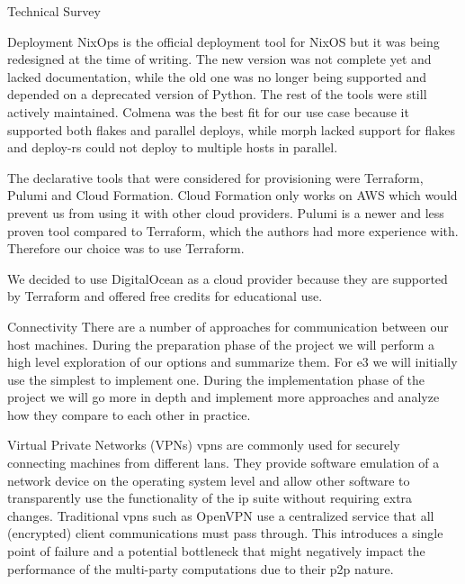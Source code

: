 \begin{frame}{Technical Survey}
\begin{block}{Deployment}
NixOps is the official deployment tool for NixOS but it was being
redesigned at the time of writing. The new version was not complete yet
and lacked documentation, while the old one was no longer being
supported and depended on a deprecated version of Python. The rest of
the tools were still actively maintained. Colmena was the best fit for
our use case because it supported both flakes and parallel deploys,
while morph lacked support for flakes and deploy-rs could not deploy to
multiple hosts in parallel.

The declarative tools that were considered for provisioning were
Terraform, Pulumi and Cloud Formation. Cloud Formation only works on AWS
which would prevent us from using it with other cloud providers. Pulumi
is a newer and less proven tool compared to Terraform, which the authors
had more experience with. Therefore our choice was to use Terraform.

We decided to use DigitalOcean as a cloud provider because they are
supported by Terraform and offered free credits for educational use.
\end{block}

\begin{block}{Connectivity}
\protect\hypertarget{connectivity}{}
There are a number of approaches for communication between our host
machines. During the preparation phase of the project we will perform a
high level exploration of our options and summarize them. For \gls{e3}
we will initially use the simplest to implement one. During the
implementation phase of the project we will go more in depth and
implement more approaches and analyze how they compare to each other in
practice.

\begin{block}{Virtual Private Networks (VPNs)}
\protect\hypertarget{virtual-private-networks-vpns}{}
\glspl{vpn} are commonly used for securely connecting machines from
different \glspl{lan}. They provide software emulation of a network
device on the operating system level and allow other software to
transparently use the functionality of the \gls{ip} suite without
requiring extra changes. Traditional \glspl{vpn} such as
OpenVPN\autocite{openVPNDocs} use a centralized service that all
(encrypted) client communications must pass through. This introduces a
single point of failure and a potential bottleneck that might negatively
impact the performance of the multi-party computations due to their
\gls{p2p} nature.


\end{block}
\end{block}
\end{frame}
